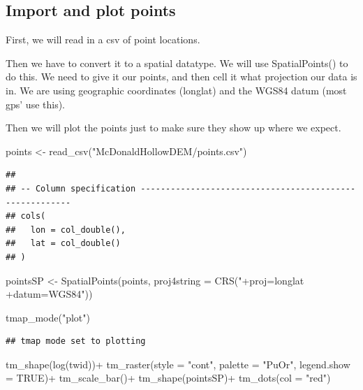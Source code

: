 \documentclass[
]{book}
\newenvironment{Shaded}{\begin{snugshade}}{\end{snugshade}}
\newcommand{\AttributeTok}[1]{\textcolor[rgb]{0.77,0.63,0.00}{#1}}
\newcommand{\ConstantTok}[1]{\textcolor[rgb]{0.00,0.00,0.00}{#1}}
\newcommand{\FunctionTok}[1]{\textcolor[rgb]{0.00,0.00,0.00}{#1}}
\newcommand{\NormalTok}[1]{#1}
\newcommand{\OtherTok}[1]{\textcolor[rgb]{0.56,0.35,0.01}{#1}}
\newcommand{\SpecialCharTok}[1]{\textcolor[rgb]{0.00,0.00,0.00}{#1}}
\newcommand{\StringTok}[1]{\textcolor[rgb]{0.31,0.60,0.02}{#1}}
\begin{document}
\hypertarget{import-and-plot-points}{%
\subsection{Import and plot points}\label{import-and-plot-points}}

First, we will read in a csv of point locations.

Then we have to convert it to a spatial datatype. We will use SpatialPoints() to do this. We need to give it our points, and then cell it what projection our data is in. We are using geographic coordinates (longlat) and the WGS84 datum (most gps' use this).

Then we will plot the points just to make sure they show up where we expect.

\begin{Shaded}
\begin{Highlighting}[]
\NormalTok{points }\OtherTok{\textless{}{-}} \FunctionTok{read\_csv}\NormalTok{(}\StringTok{"McDonaldHollowDEM/points.csv"}\NormalTok{)}
\end{Highlighting}
\end{Shaded}

\begin{verbatim}
## 
## -- Column specification --------------------------------------------------------
## cols(
##   lon = col_double(),
##   lat = col_double()
## )
\end{verbatim}

\begin{Shaded}
\begin{Highlighting}[]
\NormalTok{pointsSP }\OtherTok{\textless{}{-}} \FunctionTok{SpatialPoints}\NormalTok{(points, }\AttributeTok{proj4string =} \FunctionTok{CRS}\NormalTok{(}\StringTok{"+proj=longlat +datum=WGS84"}\NormalTok{))}

\FunctionTok{tmap\_mode}\NormalTok{(}\StringTok{"plot"}\NormalTok{)}
\end{Highlighting}
\end{Shaded}

\begin{verbatim}
## tmap mode set to plotting
\end{verbatim}

\begin{Shaded}
\begin{Highlighting}[]
\FunctionTok{tm\_shape}\NormalTok{(}\FunctionTok{log}\NormalTok{(twid))}\SpecialCharTok{+}
  \FunctionTok{tm\_raster}\NormalTok{(}\AttributeTok{style =} \StringTok{"cont"}\NormalTok{, }\AttributeTok{palette =} \StringTok{"PuOr"}\NormalTok{, }\AttributeTok{legend.show =} \ConstantTok{TRUE}\NormalTok{)}\SpecialCharTok{+}
  \FunctionTok{tm\_scale\_bar}\NormalTok{()}\SpecialCharTok{+}
\FunctionTok{tm\_shape}\NormalTok{(pointsSP)}\SpecialCharTok{+}
  \FunctionTok{tm\_dots}\NormalTok{(}\AttributeTok{col =} \StringTok{"red"}\NormalTok{)}
\end{Highlighting}
\end{Shaded}
\end{document}
